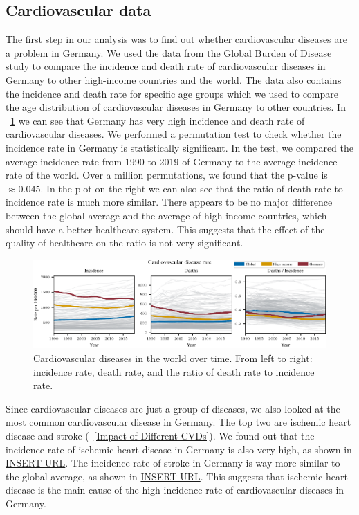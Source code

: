 \subsection{Cardiovascular data}\label{sec:cardiovascular_data}
The first step in our analysis was to find out whether cardiovascular diseases are a problem in Germany. We used the data from the Global Burden of Disease study \citep{GBD2019}
to compare the incidence and death rate of cardiovascular diseases in Germany to other high-income countries and the world. The data also contains 
the incidence and death rate for specific age groups which we used to compare the age distribution of cardiovascular diseases in Germany to other countries.
In \figurename~\ref{Cardiovascular diseases over time} we can see that Germany has very high incidence and death rate of cardiovascular diseases. We performed a
permutation test to check whether the incidence rate in Germany is statistically significant. In the test, we compared the average incidence rate from 1990 to 2019
of Germany to the average incidence rate of the world. Over a million permutations, we found that the p-value is $\approx 0.045$. 
In the plot on the right we can also see that the ratio of death rate to incidence rate is much more similar. There appears to be no major difference between the global average and the average of 
high-income countries, which should have a better healthcare system. This suggests that the effect of the quality of healthcare on the ratio is not very significant.

\begin{figure}[h]
    \vskip 0.2in
    \centering
    \centerline{\includegraphics[]{fig/fig_cardiovascular_disease_rate.pdf}}
    \caption{Cardiovascular diseases in the world over time. From left to right: incidence rate, death rate, 
    and the ratio of death rate to incidence rate.}
    \label{Cardiovascular diseases over time}
\end{figure}

Since cardiovascular diseases are just a group of diseases, we also looked at the most common cardiovascular disease in Germany. The top two are ischemic heart disease and 
stroke (\figurename~\ref{Impact of Different CVDs}). We found out that the incidence rate of ischemic heart disease in Germany is also very high, as shown in \url{INSERT URL}. The incidence rate of stroke in Germany
is way more similar to the global average, as shown in \url{INSERT URL}. This suggests that ischemic heart disease is the main cause of the high incidence rate of 
cardiovascular diseases in Germany.

